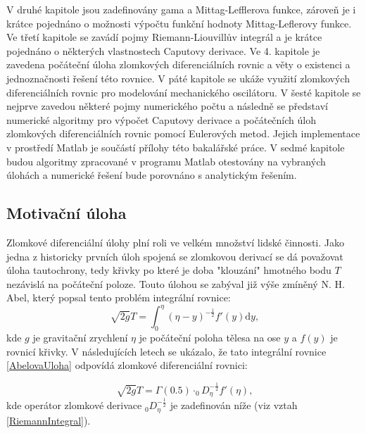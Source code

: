 \documentclass[a4paper,12pt,twoside]{article}
\theoremstyle{definition}
\theoremstyle{remark}
\numberwithin{equation}{section}
\numberwithin{table}{section}
\numberwithin{figure}{section}
\newcommand{\dx}[1]{\mathrm{d} #1}
\begin{document}
V druhé kapitole jsou zadefinovány gama a Mittag-Lefflerova funkce, zároveň je i krátce pojednáno o možnosti výpočtu funkční hodnoty Mittag-Leflerovy funkce. Ve třetí kapitole se zavádí pojmy Riemann-Liouvillův integrál a je krátce pojednáno o některých vlastnostech Caputovy derivace. Ve 4. kapitole je zavedena počáteční úloha zlomkových diferenciálních rovnic a věty o existenci a jednoznačnosti řešení této rovnice. V páté kapitole se ukáže využití zlomkových diferenciálních rovnic pro modelování mechanického oscilátoru. V šesté kapitole se nejprve zavedou některé pojmy numerického počtu a následně se představí numerické algoritmy pro výpočet Caputovy derivace a počátečních úloh zlomkových diferenciálních rovnic pomocí Eulerových metod. Jejich implementace v prostředí Matlab je součástí přílohy této bakalářské práce. V sedmé kapitole budou algoritmy zpracované v programu Matlab otestovány na vybraných úlohách a numerické řešení bude porovnáno s analytickým řešením.

\subsection{Motivační úloha} 
Zlomkové diferenciální úlohy plní roli ve velkém množství lidské činnosti. Jako jedna z historicky prvních úloh spojená se zlomkovou derivací se dá považovat úloha tautochrony, tedy křivky po které je doba "klouzání" hmotného bodu $ T$ nezávislá na počáteční poloze. Touto úlohou se zabýval již výše zmíněný N. H. Abel, který popsal tento problém integrální rovnice:
\begin{equation} \label{AbelovaUloha}
		\sqrt[]{2g}T = \int_{0}^{\eta } \left( \eta - y\right) ^{-\frac{1}{2}} f'\left( y\right) \dx{y},
\end{equation}
kde $g$ je gravitační zrychlení $\eta$ je počáteční poloha tělesa na ose $y$ a $f\left(y\right) $ je  rovnicí křivky.
V následujících letech se ukázalo, že tato integrální rovnice \eqref{AbelovaUloha} odpovídá zlomkové diferenciální rovnici: %

$$
	\sqrt[]{2g}T = \Gamma\left( 0.5 \right) \cdot _{0}\!D_{\eta}^{-\frac{1}{2}} f'\left( \eta \right), 
$$
kde operátor zlomkové derivace $_{0}\!D_{\eta}^{-\frac{1}{2}}$ je zadefinován níže (viz vztah  \eqref{RiemannIntegral}).

\end{document}
